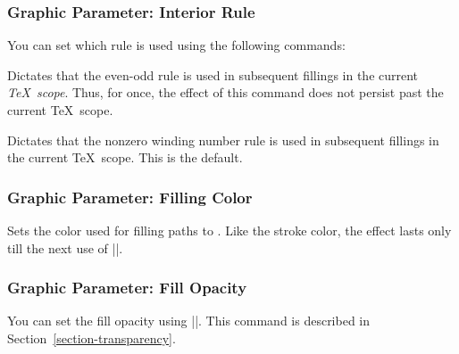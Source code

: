 \subsubsection{Graphic Parameter: Interior Rule}

You can set which rule is used using the following commands:

\begin{command}{\pgfseteorule}
    Dictates that the even-odd rule is used in subsequent fillings in the
    current \emph{\TeX\ scope}. Thus, for once, the effect of this command does
    not persist past the current \TeX\ scope.
\begin{codeexample}[]
\begin{pgfpicture}
  \pgfseteorule
  \pgfpathcircle{\pgfpoint{0mm}{0cm}}{7mm}
  \pgfpathcircle{\pgfpoint{5mm}{0cm}}{7mm}
\end{pgfpicture}
\end{codeexample}
\end{command}

\begin{command}{\pgfsetnonzerorule}
    Dictates that the nonzero winding number rule is used in subsequent
    fillings in the current \TeX\ scope. This is the default.
\begin{codeexample}[]
\begin{pgfpicture}
  \pgfsetnonzerorule
  \pgfpathcircle{\pgfpoint{0mm}{0cm}}{7mm}
  \pgfpathcircle{\pgfpoint{5mm}{0cm}}{7mm}
\end{pgfpicture}
\end{codeexample}
\end{command}


\subsubsection{Graphic Parameter: Filling Color}

\begin{command}{\pgfsetfillcolor{}}
    Sets the color used for filling paths to . Like the stroke
    color, the effect lasts only till the next use of |\color|.
\end{command}


\subsubsection{Graphic Parameter: Fill Opacity}

You can set the fill opacity using |\pgfsetfillopacity|. This command is
described in Section~\ref{section-transparency}.


